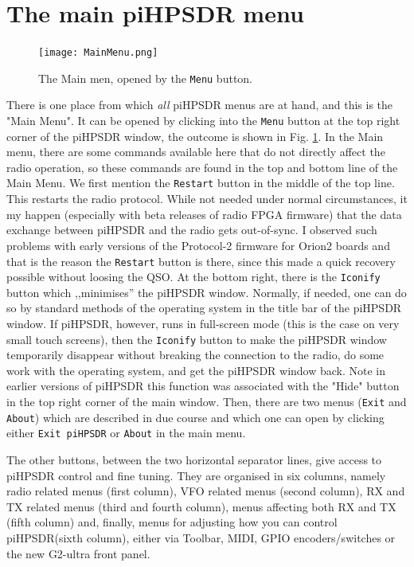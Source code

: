 \documentclass[12pt]{book}
\def\rett#1{\texttt{\color{red}#1}}
\def\bltt#1{\texttt{\color{blue}#1}}
\def\pH{pi\-HPSDR\xspace}
\begin{document}
\section{The main \pH menu}
\begin{figure}[ht]
\center
\texttt{[image: MainMenu.png]}
\caption{The Main men, opened by the \rett{Menu} button.}
\label{fig:MainMenu}
\end{figure}

There is one place from which \textit{all} \pH menus are at hand,
and this is the "Main Menu". It can be opened by clicking into the \rett{Menu} button at the
top right corner of the \pH window, the outcome is shown in Fig. \ref{fig:MainMenu}.
In the Main menu, there are some commands available here that do not directly affect the radio operation,
so these commands are found in the top and bottom line of the Main Menu. We first
mention the \rett{Restart} button in the middle of the top line. This restarts the
radio protocol. While not needed under normal circumstances, it my happen (especially
with beta releases of radio FPGA firmware) that the data exchange between \pH and
the radio gets out-of-sync. I observed such problems with early versions of the Protocol-2
firmware for Orion2 boards and that is the reason the \rett{Restart} button is
there, since this made a quick recovery possible without loosing the QSO.
At the bottom right, there is the \rett{Iconify} button which ,,minimises'' the
\pH window. Normally, if needed, one can do so by standard methods of the
operating system in the title bar of the \pH window. If \pH, however,
runs in full-screen mode (this is the case on very small touch screens), then the
\rett{Iconify} button to make the \pH window temporarily disappear without
breaking the connection to the radio, do some work with the operating system, and
get the \pH window back. Note in earlier versions of \pH this function was
associated with the "Hide" button in the top right corner of the main window.
Then, there are two menus (\bltt{Exit} and \bltt{About}) which are described in due course and which
one can open by clicking either \rett{Exit \pH} or \rett{About} in the main menu.

The other buttons, between the two horizontal separator lines, give access to \pH
control and fine tuning. They are organised in six columns, namely radio related
menus (first column), VFO related menus (second column), RX and TX related menus (third
and fourth column), menus affecting both RX and TX (fifth column) and, finally,
menus for adjusting how you can control \pH (sixth column), either via Toolbar,
MIDI, GPIO encoders/switches or the new G2-ultra front panel.
\end{document}
